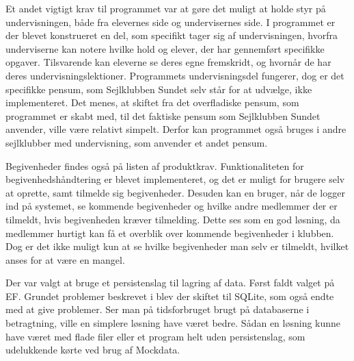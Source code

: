 Et andet vigtigt krav til programmet var at gøre det muligt at holde styr på undervisningen, både fra elevernes side og undervisernes side. 
I programmet er der blevet konstrueret en del, som specifikt tager sig af undervisningen, hvorfra underviserne kan notere hvilke hold og elever, der har gennemført specifikke opgaver.
Tilsvarende kan eleverne se deres egne fremskridt, og hvornår de har deres undervisningslektioner.
Programmets undervisningsdel fungerer, dog er det specifikke pensum, som Sejlklubben Sundet selv står for at udvælge, ikke implementeret. 
Det menes, at skiftet fra det overfladiske pensum, som programmet er skabt med, til det faktiske pensum som Sejlklubben Sundet anvender, ville være relativt simpelt. 
Derfor kan programmet også bruges i andre sejlklubber med undervisning, som anvender et andet pensum.

Begivenheder findes også på listen af produktkrav.
Funktionaliteten for begivenhedshåndtering er blevet implementeret, og det er muligt for brugere selv at oprette, samt tilmelde sig begivenheder.
Desuden kan en bruger, når de logger ind på systemet, se kommende begivenheder og hvilke andre medlemmer der er tilmeldt, hvis begivenheden kræver tilmelding. 
Dette ses som en god løsning, da medlemmer hurtigt kan få et overblik over kommende begivenheder i klubben.
Dog er det ikke muligt kun at se hvilke begivenheder man selv er tilmeldt, hvilket anses for at være en mangel. 

Der var valgt at bruge et persistenslag til lagring af data. 
Først faldt valget på \acl{EF}. 
Grundet problemer beskrevet i  blev der skiftet til SQLite, som også endte med at give problemer. 
Ser man på tidsforbruget brugt på databaserne i betragtning, ville en simplere løsning have været bedre.
Sådan en løsning kunne have været med flade filer eller et program helt uden persistenslag, som udelukkende kørte ved brug af Mockdata.  

